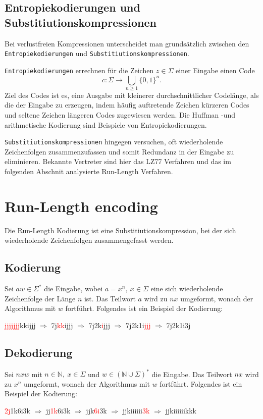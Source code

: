 \documentclass{article}
\newcommand{\R}{\Rightarrow}
\newcommand{\bb}[1]{\mathbb{{#1}}}
\newcommand{\red}{\textcolor{red}}
\newcommand{\para}{\par\null\par}
\begin{document}
\subsection{Entropiekodierungen und Substitiutionskompressionen}
Bei verlustfreien Kompressionen unterscheidet man grundsätzlich zwischen den
\texttt{Entropiekodierungen} und \texttt{Substitiutionskompressionen}.
\para
\texttt{Entropiekodierungen} errechnen für die Zeichen $z \in \Sigma$ einer Eingabe einen Code 
\[c: \Sigma \to \bigcup\limits_{n\geq1} \{0,1\}^n.\]
Ziel des Codes ist es, eine Ausgabe mit kleinerer durchschnittlicher Codel\"ange, 
als die der Eingabe zu erzeugen, indem häufig auftretende Zeichen 
kürzeren Codes und seltene Zeichen längeren Codes zugewiesen werden.
Die Huffman -und arithmetische Kodierung sind Beispiele von Entropiekodierungen.
\para
\texttt{Substitiutionskompressionen} hingegen versuchen, oft wiederholende Zeichenfolgen 
zusammenzufassen und somit Redundanz in der Eingabe zu eliminieren. Bekannte Vertreter
sind hier das LZ77 Verfahren und das im folgenden Abschnit analysierte Run-Length Verfahren.
\section{Run-Length encoding} 
Die Run-Length Kodierung ist eine Substitiutionskompression, bei der sich wiederholende
Zeichenfolgen zusammengefasst werden.
\subsection{Kodierung}
Sei $aw \in \Sigma^*$ die Eingabe, wobei $a = x^n,~x\in \Sigma$ eine
sich wiederholende Zeichenfolge der Länge $n$ ist. Das Teilwort $a$ wird zu $nx$ umgeformt, 
wonach der Algorithmus mit $w$ fortführt. Folgendes ist ein Beispiel der Kodierung:
\begin{center}
    \red{jjjjjjj}kkijjj $\R$ 7j\red{kk}ijjj $\R$ 7j2k\red{i}jjj $\R$ 7j2k1i\red{jjj} $\R$ 7j2k1i3j
\end{center}
\subsection{Dekodierung}
Sei $nxw$ mit $n\in \bb{N},~x\in\Sigma$ und $w\in(\bb{N}\cup\Sigma)^*$ die Eingabe. Das Teilwort $nx$ wird
zu $x^n$ umgeformt, wonach der Algorithmus mit $w$ fortführt. Folgendes ist ein Beispiel der Kodierung:
\begin{center}
    \red{2j}1k6i3k $\R$ jj\red{1k}6i3k $\R$ jjk\red{6i}3k $\R$ jjkiiiiii\red{3k} $\R$ jjkiiiiiikkk
\end{center}
\end{document}
